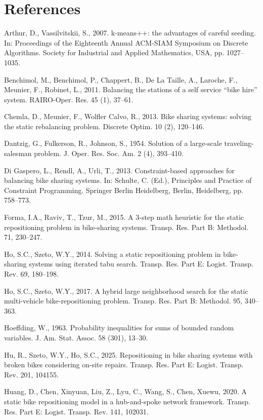 \documentclass[11pt]{article}
\numberwithin{table}{section}
\numberwithin{figure}{section}
\begin{document}
\section*{References}
\begingroup
\setlength{\parindent}{0pt}
\setlength{\parskip}{0.45em}
Arthur, D., Vassilvitskii, S., 2007. k-means++: the advantages of careful seeding. In: Proceedings of the Eighteenth Annual ACM-SIAM Symposium on Discrete Algorithms. Society for Industrial and Applied Mathematics, USA, pp. 1027–1035.\par
Benchimol, M., Benchimol, P., Chappert, B., De La Taille, A., Laroche, F., Meunier, F., Robinet, L., 2011. Balancing the stations of a self service “bike hire” system. RAIRO-Oper. Res. 45 (1), 37–61.\par
Chemla, D., Meunier, F., Wolfler Calvo, R., 2013. Bike sharing systems: solving the static rebalancing problem. Discrete Optim. 10 (2), 120–146.\par
Dantzig, G., Fulkerson, R., Johnson, S., 1954. Solution of a large-scale traveling-salesman problem. J. Oper. Res. Soc. Am. 2 (4), 393–410.\par
Di Gaspero, L., Rendl, A., Urli, T., 2013. Constraint-based approaches for balancing bike sharing systems. In: Schulte, C. (Ed.), Principles and Practice of Constraint Programming. Springer Berlin Heidelberg, Berlin, Heidelberg, pp. 758–773.\par
Forma, I.A., Raviv, T., Tzur, M., 2015. A 3-step math heuristic for the static repositioning problem in bike-sharing systems. Transp. Res. Part B: Methodol. 71, 230–247.\par
Ho, S.C., Szeto, W.Y., 2014. Solving a static repositioning problem in bike-sharing systems using iterated tabu search. Transp. Res. Part E: Logist. Transp. Rev. 69, 180–198.\par
Ho, S.C., Szeto, W.Y., 2017. A hybrid large neighborhood search for the static multi-vehicle bike-repositioning problem. Transp. Res. Part B: Methodol. 95, 340–363.\par
Hoeffding, W., 1963. Probability inequalities for sums of bounded random variables. J. Am. Stat. Assoc. 58 (301), 13–30.\par
Hu, R., Szeto, W.Y., Ho, S.C., 2025. Repositioning in bike sharing systems with broken bikes considering on-site repairs. Transp. Res. Part E: Logist. Transp. Rev. 201, 104155.\par
Huang, D., Chen, Xinyuan, Liu, Z., Lyu, C., Wang, S., Chen, Xuewu, 2020. A static bike repositioning model in a hub-and-spoke network framework. Transp. Res. Part E: Logist. Transp. Rev. 141, 102031.\par
\end{document}
